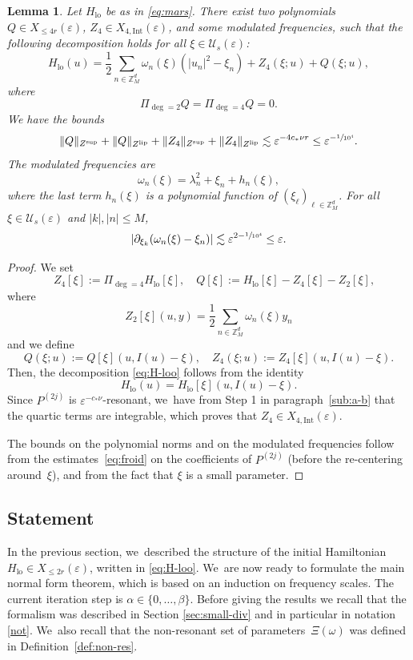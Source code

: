 \documentclass[10pt,a4paper]{amsart}
\theoremstyle{plain}
\newtheorem{lemma}[theorem]{Lemma}
\theoremstyle{definition}
\DeclareMathOperator{\lo}{lo}
\newcommand{\Z}{\mathbb{Z}}
\newcommand{\1}{\mathbf{1}}
\let\epsilon\varepsilon
\begin{document}
\begin{lemma} Let $H_{\lo}$ be as in \eqref{eq:mars}. There exist two polynomials $Q\in X_{\leq 4r}(\epsilon)$, $Z_{4}\in X_{4,\mathrm{Int}}(\epsilon)$, and some modulated frequencies, such that the following decomposition holds for all $\xi\in\mathcal{U}_{s}(\epsilon)$:
\begin{equation}
\label{eq:H-loo}
H_{\lo}(u) = \frac{1}{2}\sum_{n\in\Z_{M}^{d}}\omega_{n}(\xi)(|u_n|^{2}-\xi_{n}
)
+ Z_{4}(\xi;u)
+ Q(\xi;u),
\end{equation}
where
\[
\Pi_{\deg=2}Q = \Pi_{\deg=4}Q=0.
\]
We have the bounds
\[
\|Q\|_{Z^{\mathrm{sup}}}
+\|Q\|_{Z^{\mathrm{lip}}}
+
\|Z_{4}\|_{Z^{\mathrm{sup}}}
+\|Z_{4}\|_{Z^{\mathrm{lip}}}
\lesssim \epsilon^{-4c_{\ast}\nu r} \leq \epsilon^{-\sfrac{1}{10^{4}}}.
\]
The modulated frequencies are
\[
\omega_{n}(\xi) = \lambda_{n}^{2} +\xi_{n}+h_{n}(\xi),
\]
where the last term $h_{n}(\xi)$ is a polynomial function of $(\xi_{\ell})_{\ell\in\Z_{M}^{d}}$. For all $\xi\in\mathcal{U}_{s}(\epsilon)$ and $|k|,|n|\leq M$,
\[
|\partial_{\xi_{k}}(\omega_{n}(\xi)-\xi_{n})| \lesssim \epsilon^{2-\sfrac{1}{10^{4}}} \leq \epsilon.
\]
\end{lemma}
\begin{proof}
We set
\[
\quad Z_{4}[\xi]:= \Pi_{\deg=4}H_{\lo}[\xi],\quad Q[\xi] := H_{\lo}[\xi] - Z_{4}[\xi] - Z_{2}[\xi],
\]
where
\[
Z_{2}[\xi](u,y) = \frac{1}{2}\sum_{n\in\Z_{M}^{d}}\omega_{n}(\xi)y_{n}
\]
and we define
\[
Q(\xi;u):= Q[\xi](u,I(u)-\xi),\quad Z_{4}(\xi;u):= Z_{4}[\xi](u,I(u)-\xi).
\]
Then, the decomposition \eqref{eq:H-loo} follows from the identity
\[
H_{\lo}(u) = H_{\lo}[\xi](u,I(u)-\xi).
\]
Since $P^{(2j)}$ is $\epsilon^{-c_{\ast}\nu}$-resonant, we~have from Step 1 in paragraph~\ref{sub:a-b} that the quartic terms are integrable, which proves that $Z_{4}\in X_{4,\mathrm{Int}}(\epsilon)$.

The bounds on the polynomial norms and on the modulated frequencies follow from the estimates~\eqref{eq:froid} on the coefficients of $P^{(2j)}$ (before the re-centering around~$\xi$), and from the fact that $\xi$ is a small parameter.
\end{proof}

\subsection{Statement}

In the previous section, we~described the structure of the initial Hamiltonian $H_{\lo}\in X_{\leq2r}(\epsilon)$, written in \eqref{eq:H-loo}. We~are now ready to formulate the main normal form theorem, which is based on an induction on frequency scales. The current iteration step is $\alpha\in\{0,\dots,\beta\}$. Before giving the results we recall that the formalism was described in Section \ref{sec:small-div} and in particular in notation \ref{not}. We~also recall that the non-resonant set of parameters~$\Xi(\omega)$ was defined in Definition~\ref{def:non-res}.
\end{document}
